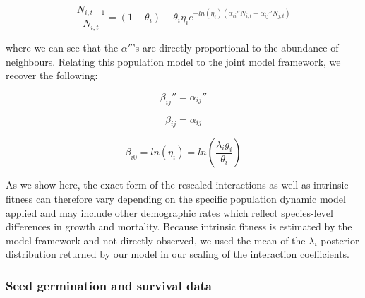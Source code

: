 \documentclass[a4,12pt]{article}
\begin{document}
        \begin{equation}
            \frac{N_{i, t+1}}{N_{i, t}} = (1 - \theta_{i}) + \theta_{i} \eta_{i} e^{-ln(\eta_{i})({\alpha_{ii}}'' N_{i, t} + {\alpha_{ij}}'' N_{j, t})}
        \end{equation}

        where we can see that the ${\alpha}''$'s are directly proportional to the abundance of neighbours. Relating this population model to the joint model framework, we recover the following: 

        \begin{equation}
        {\beta_{ij}}'' = {\alpha_{ij}}''
        \end{equation}

        \begin{equation}
        \beta_{ij} = \alpha_{ij}
        \end{equation}

        \begin{equation}
        \beta_{i0}  = ln(\eta_{i}) = ln(\frac{\lambda_{i} g_{i}}{\theta_{i}})
        \end{equation}


        As we show here, the exact form of the rescaled interactions as well as intrinsic fitness can therefore vary depending on the specific population dynamic model applied and may include other demographic rates which reflect species-level differences in growth and mortality. Because intrinsic fitness is estimated by the model framework and not directly observed, we used the mean of the $\lambda_{i}$ posterior distribution returned by our model in our scaling of the interaction coefficients.


        \subsubsection{Seed germination and survival data}
        \label{SI:germination}
\end{document}
